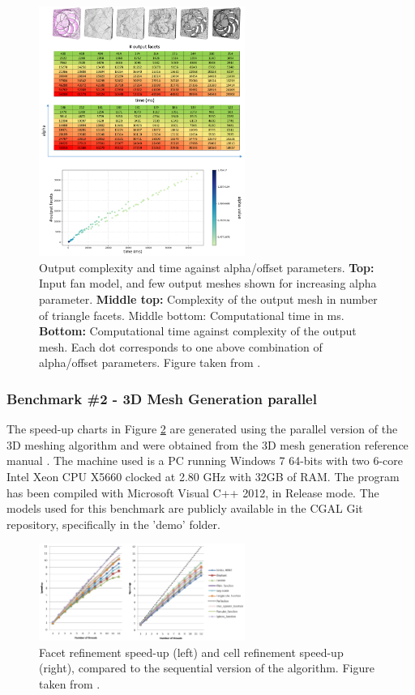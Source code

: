 \begin{figure}[htb]
    \centering
    \includegraphics[width=0.6\textwidth]{graphics/cgal/fan.png} 
    \caption{Output complexity and time against alpha/offset parameters.
\textbf{Top:} Input fan model, and few output meshes shown for increasing alpha parameter. \textbf{Middle top:} Complexity of the output mesh in number of triangle
facets. Middle bottom: Computational time in ms. \textbf{Bottom:} Computational time against complexity of the output mesh. Each dot corresponds to one above combination of alpha/offset parameters. Figure taken from \cite{portaneri_alpha_2022}.}
\label{WP1::CGAL::aw3}
\end{figure}



\subsubsection{Benchmark \#2 - 3D Mesh Generation parallel}


The speed-up charts in Figure \ref{WP1::CGAL::mg3parallel} are generated using the parallel version of the 3D meshing algorithm and were obtained from the 3D mesh generation reference manual \cite{alliez_3d_2024}. 
The machine used is a PC running Windows 7 64-bits with two 6-core Intel Xeon CPU X5660 clocked at 2.80 GHz with 32GB of RAM. 
The program has been compiled with Microsoft Visual C++ 2012, in Release mode.
The models used for this benchmark are publicly available in the CGAL Git repository, specifically in the 'demo' folder.


\begin{figure}[htb]
    \centering
    \includegraphics[width=0.6\textwidth]{graphics/cgal/refinement_speedup.png} 
    \caption{Facet refinement speed-up (left) and cell refinement speed-up (right), compared to the sequential version of the algorithm. Figure taken from \cite{alliez_3d_2024}.}
    \label{WP1::CGAL::mg3parallel}
\end{figure}


